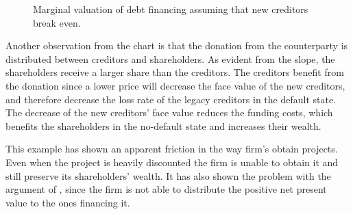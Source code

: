 \documentclass[main.tex]{subfiles}
\begin{document}
        \begin{figure}
            \centering
            \resizebox{\textwidth}{!}{%
                
            }
            \caption{
                Marginal valuation of debt financing 
                assuming that new creditors break even.
            }
            \label{fig:marginal-value-debt-financing}
        \end{figure}

        Another observation from the chart is that the donation from the counterparty 
        is distributed between creditors and shareholders.
        As evident from the slope, the shareholders receive a larger share than the creditors.
        The creditors benefit from the donation since a lower price will
        decrease the face value of the new creditors, and therefore decrease the loss rate
        of the legacy creditors in the default state.
        The decrease of the new creditors' face value reduces the funding costs,
        which benefits the shareholders in the no-default state and increases their wealth.  

        This example has shown an apparent friction in the way firm's obtain projects.
        Even when the project is heavily discounted the firm is unable to obtain it
        and still preserve its shareholders' wealth.
        It has also shown the problem with the argument of \textcite{HullWhite2012FVA},
        since the firm is not able to distribute the positive net present value
        to the ones financing it.
        
\end{document}
